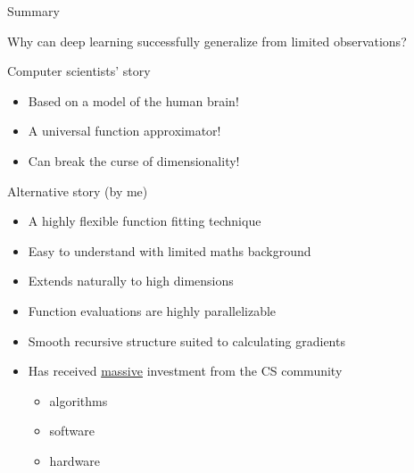 \begin{frame}{Summary}
    
    Why can deep learning successfully generalize from limited observations?

\end{frame}


\begin{frame}{Computer scientists' story}

    \begin{itemize}
        \item Based on a model of the human brain! 
        \vspace{0.5em}
        \vspace{0.5em}
        \item A universal function approximator!
        \vspace{0.5em}
        \vspace{0.5em}
        \item Can break the curse of dimensionality!
    \end{itemize}


\end{frame}

\begin{frame}{Alternative story (by me)}


    \begin{itemize}
        \item A highly flexible function fitting technique 
        \vspace{0.5em}
        \item Easy to understand with limited maths background
        \vspace{0.5em}
        \item Extends naturally to high dimensions 
        \vspace{0.5em}
        \item Function evaluations are highly parallelizable
        \vspace{0.5em}
        \item Smooth recursive structure suited to calculating gradients
        \vspace{0.5em}
        \item Has received \underline{massive} investment from the CS community
            \begin{itemize}
                \vspace{0.5em}
                \item algorithms
                \vspace{0.5em}
                \item software
                \vspace{0.5em}
                \item hardware
            \end{itemize}
    \end{itemize}

\end{frame}

